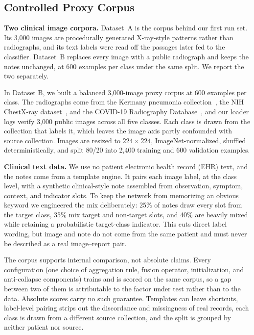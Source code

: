 \documentclass[letterpaper, conference]{IEEEtran}
\begin{document}
\subsection{Controlled Proxy Corpus}

\textbf{Two clinical image corpora.} Dataset~A is the corpus behind our first run set. Its 3,000
images are procedurally generated X-ray-style patterns rather than radiographs, and
its text labels were read off the passages later fed to the classifier. Dataset~B
replaces every image with a public radiograph and keeps the notes unchanged, at 600
examples per class under the same split. We report the two separately.

In Dataset B, we built a balanced 3,000-image proxy corpus at 600 examples per class. The
radiographs come from the Kermany pneumonia collection~\cite{Kermany2018}, the NIH
ChestX-ray dataset~\cite{Wang2017chestxray8}, and the COVID-19 Radiography
Database~\cite{Chowdhury2020covid}, and our loader logs verify 3,000 public images
across all five classes. Each class is drawn from the collection that labels it,
which leaves the image axis partly confounded with source collection. Images are
resized to
$224{\times}224$, ImageNet-normalized, shuffled deterministically, and split 80/20
into 2,400 training and 600 validation examples.

\textbf{Clinical text data.}
We use no patient electronic health record (EHR) text, and the notes come from a
template engine. It pairs each image label, at
the class level, with a synthetic clinical-style note assembled from observation,
symptom, context, and indicator slots. To keep the network from memorizing an
obvious keyword we engineered the mix deliberately: 25\% of notes
draw every slot from the target class, 35\% mix target and non-target slots, and
40\% are heavily mixed while retaining a probabilistic target-class indicator.
This cuts direct label wording, but image and note do not come from the same
patient and must never be described as a real image--report pair.

\label{sec:corpus}
The corpus supports internal comparison, not absolute claims.
Every configuration (one choice of aggregation rule, fusion operator,
initialization, and anti-collapse components) trains and is scored on the same
corpus, so a gap between two of them is
attributable to the factor under test rather than to the data. Absolute scores carry
no such guarantee. Templates can leave
shortcuts, label-level pairing strips out the discordance and missingness of real
records, each class is drawn from a different source collection, and the split
is grouped by neither patient nor source.
\end{document}
